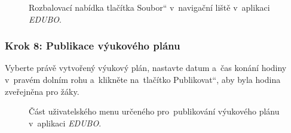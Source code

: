 \documentclass[male,czech,api_bc]{kitheses}
\begin{document}
\begin{figure}[H]
	\centering
	\caption{Rozbalovací nabídka tlačítka \quotedblbase Soubor`` v~navigační liště v~aplikaci \textit{EDUBO}.}
	\label{fig:manual-3}
\end{figure}

\subsubsection{Krok 8: Publikace výukového plánu}
Vyberte právě vytvořený výukový plán, nastavte datum a~čas konání hodiny v~pravém dolním rohu a~klikněte na~tlačítko \quotedblbase Publikovat``, aby byla hodina zveřejněna pro žáky.

\begin{figure}[H]
	\centering
	\caption{Část uživatelského menu určeného pro~publikování výukového plánu v~aplikaci \textit{EDUBO}.}
	\label{fig:manual-4}
\end{figure}
\end{document}
